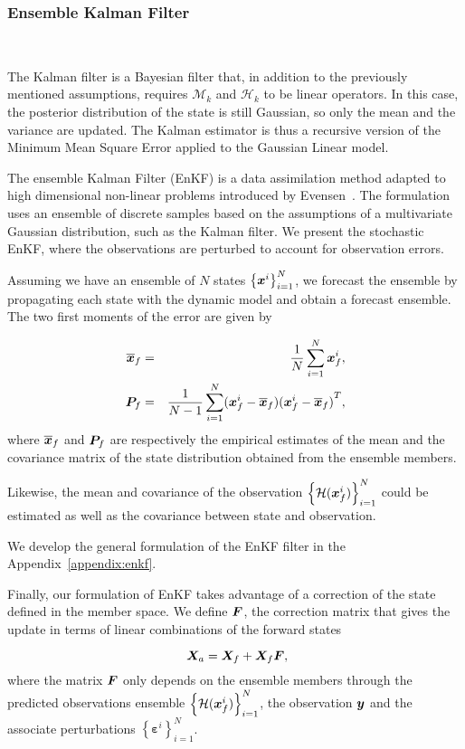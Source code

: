 \subsubsection{Ensemble Kalman Filter}~{\label{enkf}}


The Kalman filter \cite{kalman_new_1960} is a Bayesian filter that, in addition to the previously mentioned assumptions, requires $\mathcal{M}_k$ and $\mathcal{H}_k$ to be linear operators. In this case, the posterior distribution of the state is still Gaussian, so only the mean and the variance are updated. The Kalman estimator is thus a recursive version of the Minimum Mean Square Error applied to the Gaussian Linear model.

The ensemble Kalman Filter (EnKF) is a data assimilation method adapted to high dimensional non-linear problems introduced by Evensen~\cite{evensen_sequential_1994}. The formulation uses an ensemble of discrete samples based on the assumptions of a multivariate Gaussian distribution, such as the Kalman filter. We present the stochastic EnKF, where the observations are perturbed to account for observation errors.

Assuming we have an ensemble of $N$ states $\left\{\bm {\bm{x}}^i \right\}_{i=1}^N$, we forecast the ensemble by propagating each state with the dynamic model and obtain a forecast ensemble.
The two first moments of the error are given by

\begin{eqnarray*}
    \overline{\bm{x}}_f &=& \frac{1}{N} \sum_{i = 1}^{N} \bm{x}^i_f, \\
    \bm{P}_f &=& \frac{1}{N-1} \sum_{i = 1}^{N} (\bm{x}^i_f - \overline{\bm{x}}_f){(\bm{x}^i_f - \overline{\bm{x}}_f)}^T,
\end{eqnarray*}
where $\overline{\bm{x}}_f$ and $\bm{P}_f$ are respectively the empirical estimates of the mean and  the covariance matrix of the state distribution obtained from the ensemble members.

Likewise, the mean and covariance of the observation $\left\{\mathcal{H}(\bm{x}^i_f) \right\}_{i=1}^N$ could be estimated as well as the covariance between state and observation.

We develop the general formulation of the EnKF filter in the Appendix~\ref{appendix:enkf}.

Finally, our formulation of EnKF takes advantage of a correction of the state defined in the member space. We define $\bm{F}$, the correction matrix that gives the update in terms of linear combinations of the forward states

\begin{equation}~\label{enkf_formula_Fcorr}
    \bm{X}_a = \bm{X}_f + \bm{X}_f \bm{F},
\end{equation}where the matrix $\bm{F}$ only depends on the ensemble members through the predicted observations ensemble $\left\{\mathcal{H}(\bm{x}^i_f) \right\}^N_{i=1}$, the observation $\bm{y}$ and the associate perturbations  $\left\{\bm{\varepsilon}^i \right\}^N_{i=1}$.